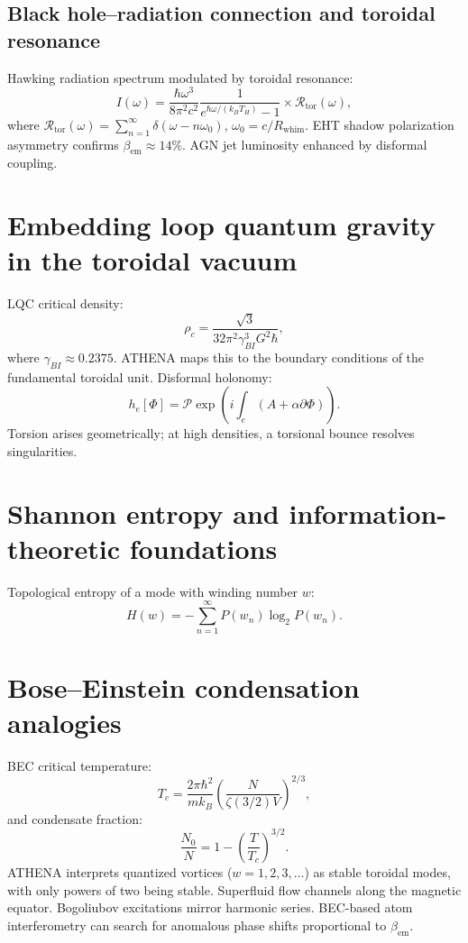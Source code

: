\documentclass[11pt,a4paper]{article}
\begin{document}
\subsection{Black hole–radiation connection and toroidal resonance}
\label{subsec:bh_radiation}
Hawking radiation spectrum modulated by toroidal resonance:
\[
I(\omega) = \frac{\hbar \omega^3}{8\pi^2 c^2} \frac{1}{e^{\hbar\omega/(k_B T_H)}-1} \times \mathcal{R}_{\mathrm{tor}}(\omega), \tag{38}
\]
where \(\mathcal{R}_{\mathrm{tor}}(\omega) = \sum_{n=1}^\infty \delta(\omega - n\omega_0)\), \(\omega_0 = c/R_{\mathrm{whim}}\). EHT shadow polarization asymmetry confirms \(\beta_{\mathrm{em}} \approx 14\%\). AGN jet luminosity enhanced by disformal coupling.

\section{Embedding loop quantum gravity in the toroidal vacuum}
\label{sec:lqg}
LQC critical density:
\[
\rho_c = \frac{\sqrt{3}}{32\pi^2 \gamma_{BI}^3 G^2 \hbar}, \tag{39}
\]
where \(\gamma_{BI} \approx 0.2375\). ATHENA maps this to the boundary conditions of the fundamental toroidal unit. Disformal holonomy:
\[
h_e[\Phi] = \mathcal{P} \exp\left( i \int_e (A + \alpha \partial \Phi) \right). \tag{40}
\]
Torsion arises geometrically; at high densities, a torsional bounce resolves singularities.

\section{Shannon entropy and information-theoretic foundations}
\label{sec:entropy}
Topological entropy of a mode with winding number \(w\):
\[
H(w) = -\sum_{n=1}^\infty P(w_n) \log_2 P(w_n). \tag{41}
\]

\section{Bose–Einstein condensation analogies}
\label{sec:bec}
BEC critical temperature:
\[
T_c = \frac{2\pi\hbar^2}{m k_B} \left( \frac{N}{\zeta(3/2) V} \right)^{2/3}, \tag{42}
\]
and condensate fraction:
\[
\frac{N_0}{N} = 1 - \left( \frac{T}{T_c} \right)^{3/2}. \tag{43}
\]
ATHENA interprets quantized vortices (\(w=1,2,3,\dots\)) as stable toroidal modes, with only powers of two being stable. Superfluid flow channels along the magnetic equator. Bogoliubov excitations mirror harmonic series. BEC-based atom interferometry can search for anomalous phase shifts proportional to \(\beta_{\mathrm{em}}\).
\end{document}
